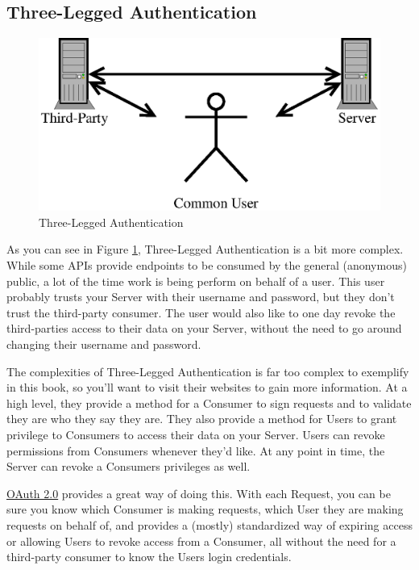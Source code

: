 \documentclass{book}
\begin{document}
\subsection{Three-Legged Authentication}

\begin{figure}[!htb]
\centering
\includegraphics[scale=.6]{images/three-legged.eps}
\caption{Three-Legged Authentication}
\label{fig:threelegged}
\end{figure}

As you can see in Figure \ref{fig:threelegged}, Three-Legged Authentication is a bit more complex. While some APIs provide endpoints to be consumed by the general (anonymous) public, a lot of the time work is being perform on behalf of a user. This user probably trusts your Server with their username and password, but they don't trust the third-party consumer. The user would also like to one day revoke the third-parties access to their data on your Server, without the need to go around changing their username and password.

The complexities of Three-Legged Authentication is far too complex to exemplify in this book, so you'll want to visit their websites to gain more information. At a high level, they provide a method for a Consumer to sign requests and to validate they are who they say they are. They also provide a method for Users to grant privilege to Consumers to access their data on your Server. Users can revoke permissions from Consumers whenever they'd like. At any point in time, the Server can revoke a Consumers privileges as well.

\href{https://tools.ietf.org/html/rfc6749}{OAuth 2.0} provides a great way of doing this. With each Request, you can be sure you know which Consumer is making requests, which User they are making requests on behalf of, and provides a (mostly) standardized way of expiring access or allowing Users to revoke access from a Consumer, all without the need for a third-party consumer to know the Users login credentials.
\end{document}
